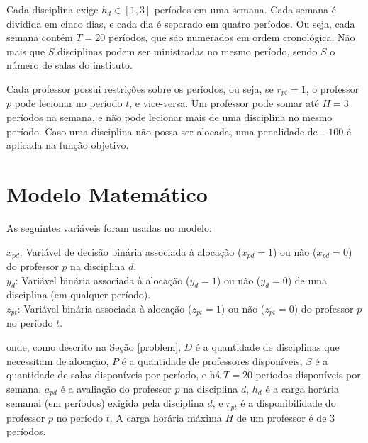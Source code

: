 \documentclass{MO824}
\newcommand{\B}{\mathbb{B}}
\begin{document}
    Cada disciplina exige $h_d \in [1,3]$ períodos em uma semana. Cada semana é dividida em cinco dias, e cada dia é separado em quatro períodos. Ou seja, cada semana contém $T=20$ períodos, que são numerados em ordem cronológica. Não mais que $S$ disciplinas podem ser ministradas no mesmo período, sendo $S$ o número de salas do instituto.
    
    Cada professor possui restrições sobre os períodos, ou seja, se $r_{pt}=1$, o professor $p$ pode lecionar no período $t$, e vice-versa. Um professor pode somar até $H=3$ períodos na semana, e não pode lecionar mais de uma disciplina no mesmo período. Caso uma disciplina não possa ser alocada, uma penalidade de $-100$ é aplicada na função objetivo.
    
\section{Modelo Matemático}
    As seguintes variáveis foram usadas no modelo:
    
    $x_{pd}$: Variável de decisão binária associada à alocação ($x_{pd}=1$) ou não ($x_{pd}=0$) do professor $p$ na disciplina $d$.\\
    
    $y_d$: Variável binária associada à alocação ($y_d = 1$) ou não ($y_d = 0$) de uma disciplina (em qualquer período).\\
    
    $z_{pt}$: Variável binária associada à alocação ($z_{pt}=1$) ou não ($z_{pt}=0$) do professor $p$ no período $t$.
    
    \begin{lpformulation}[(PAP)]
        \lpeq[dom]{x_{pd}, y_{d}, z_{pt} \in \B}{p \in \{1\dots P\}, d \in \{1\dots D\}, t \in \{1\dots T\}}
    \end{lpformulation}
    
    onde, como descrito na Seção \ref{problem}, $D$ é a quantidade de disciplinas que necessitam de alocação, $P$ é a quantidade de professores disponíveis, $S$ é a quantidade de salas disponíveis por período, e há $T=20$ períodos disponíveis por semana. $a_{pd}$ é a avaliação do professor $p$ na disciplina $d$, $h_d$ é a carga horária semanal (em períodos) exigida pela disciplina $d$, e $r_{pt}$ é a disponibilidade do professor $p$ no período $t$. A carga horária máxima $H$ de um professor é de 3 períodos.
    
\end{document}
